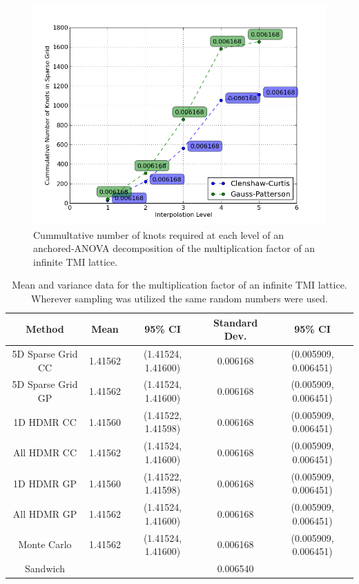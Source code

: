   

\begin{figure}
\caption{ \label{fig:kinf_numknots}
Cummultative number of knots required at each level of an anchored-\ac{ANOVA} decomposition of the multiplication factor of an infinite TMI lattice.}
 \begin{center}
  \includegraphics[scale=.75]{./Chapter3/kinf_sparse_grid_numknots.png}
 \end{center}
\end{figure}


\begin{table}[!htb] 
\caption{\label{table:kinf_mean_variance} 
Mean and variance data for the multiplication factor of an infinite TMI lattice. Wherever sampling was utilized the same random numbers were used.}
\centering
\small
\begin{tabular}{||c|c|c|c|c||} 
\hline \hline
\textbf{Method} & \textbf{Mean} & \textbf{95\% CI} & \textbf{Standard Dev.} & \textbf{95\% CI} \\ \hline
5D Sparse Grid CC      & 1.41562 & (1.41524, 1.41600) & 0.006168 & (0.005909, 0.006451) \\ \hline
5D Sparse Grid GP      & 1.41562 & (1.41524, 1.41600) & 0.006168 & (0.005909, 0.006451) \\ \hline
1D HDMR CC  & 1.41560 & (1.41522, 1.41598) & 0.006168 & (0.005909, 0.006451) \\ \hline
All HDMR CC & 1.41562 & (1.41524, 1.41600) & 0.006168 & (0.005909, 0.006451) \\ \hline
1D HDMR GP  & 1.41560 & (1.41522, 1.41598) & 0.006168 & (0.005909, 0.006451) \\ \hline
All HDMR GP & 1.41562 & (1.41524, 1.41600) & 0.006168 & (0.005909, 0.006451) \\ \hline
Monte Carlo            & 1.41562 & (1.41524, 1.41600) & 0.006168 & (0.005909, 0.006451) \\ \hline
Sandwich               &         &                    & 0.006540 &                      \\
\hline \hline
\end{tabular}
\end{table}


